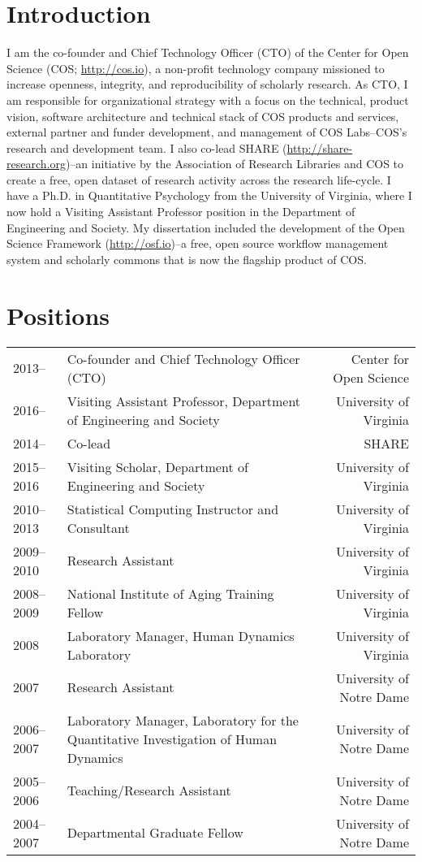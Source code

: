 \documentclass[11pt]{article}
\begin{document}
\maketitle

\section*{Introduction}
I am the co-founder and Chief Technology Officer (CTO) of the Center for Open Science (COS; \url{http://cos.io}), a non-profit technology company missioned to increase openness, integrity, and reproducibility of scholarly research. As CTO, I am responsible for organizational strategy with a focus on the technical, product vision, software architecture and technical stack of COS products and services, external partner and funder development, and management of COS Labs--COS's research and development team. I also co-lead SHARE (\url{http://share-research.org})--an initiative by the Association of Research Libraries and COS to create a free, open dataset of research activity across the research life-cycle. I have a Ph.D. in Quantitative Psychology from the University of Virginia, where I now hold a Visiting Assistant Professor position in the Department of Engineering and Society. My dissertation included the development of the Open Science Framework (\url{http://osf.io})--a free, open source workflow management system and scholarly commons that is now the flagship product of COS.

\section*{Positions}
\begin{tabularx}{\textwidth}{l X r}
2013-- 			& Co-founder and Chief Technology Officer (CTO) & Center for Open Science\\
2016--				& Visiting Assistant Professor, Department of Engineering and Society & University of Virginia \\
2014-- 			& Co-lead & SHARE \\
2015--2016		& Visiting Scholar, Department of Engineering and Society & University of Virginia \\
2010--2013 	& Statistical Computing Instructor and Consultant &  University of Virginia\\
2009--2010 	& Research Assistant & University of Virginia\\
2008--2009 	& National Institute of Aging Training Fellow & University of Virginia\\
2008 				& Laboratory Manager, Human Dynamics Laboratory & University of Virginia\\
2007 				& Research Assistant & University of Notre Dame\\
2006--2007 	& Laboratory Manager, Laboratory for the Quantitative Investigation of Human Dynamics & University of Notre Dame\\
2005--2006 	& Teaching/Research Assistant & University of Notre Dame\\
2004--2007 	& Departmental Graduate Fellow & University of Notre Dame\\
\end{tabularx}
\end{document}

